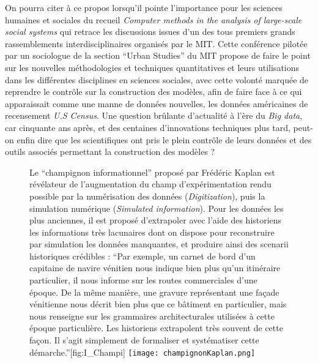 On pourra citer à ce propos \textcite{Gullahorn1966} lorsqu'il pointe l'importance pour les sciences humaines et sociales du recueil \textit{Computer methods in the analysis of large-scale social systems} qui retrace les discussions issues d'un des tous premiers grands rassemblements interdisciplinaires organisés par le MIT. Cette conférence pilotée par un sociologue de la section \foreignquote{english}{Urban Studies} du MIT \autocite{Beshers1965} propose de faire le point sur les nouvelles méthodologies et techniques quantitatives et leurs utilisations dans les différentes disciplines en sciences sociales, avec cette volonté marquée de reprendre le contrôle sur la construction des modèles, afin de faire face à ce qui apparaissait comme une manne de données nouvelles, les données américaines de recensement \textit{U.S Census}. Une question brûlante d'actualité à l'ère du \textit{Big data}, car cinquante ans après, et des centaines d'innovations techniques plus tard, peut-on enfin dire que les scientifiques ont pris le plein contrôle de leurs données et des outils associés permettant la construction des modèles ?

\begin{figure}[!htbp]
\begin{sidecaption}{Le \enquote{champignon informationnel} proposé par Frédéric Kaplan est révélateur de l'augmentation du champ d'expérimentation rendu possible par la numérisation des données (\textit{Digitization}), puis la simulation numérique (\textit{Simulated information}). Pour les données les plus anciennes, il est proposé d'extrapoler avec l'aide des historiens les informations très lacunaires dont on dispose pour reconstruire par simulation les données manquantes, et produire ainsi des scenarii historiques crédibles : \enquote{Par exemple, un carnet de bord d’un capitaine de navire vénitien nous indique bien plus qu’un itinéraire particulier, il nous informe sur les routes commerciales d’une époque. De la même manière, une gravure représentant une façade vénitienne nous décrit bien plus que ce bâtiment en particulier, mais nous renseigne sur les grammaires architecturales utilisées à cette époque particulière. Les historiens extrapolent très souvent de cette façon. Il s’agit simplement de formaliser et systématiser cette démarche.}}[fig:I_Champi]
 \centering
 \texttt{[image: champignonKaplan.png]}
  \end{sidecaption}
\end{figure}

